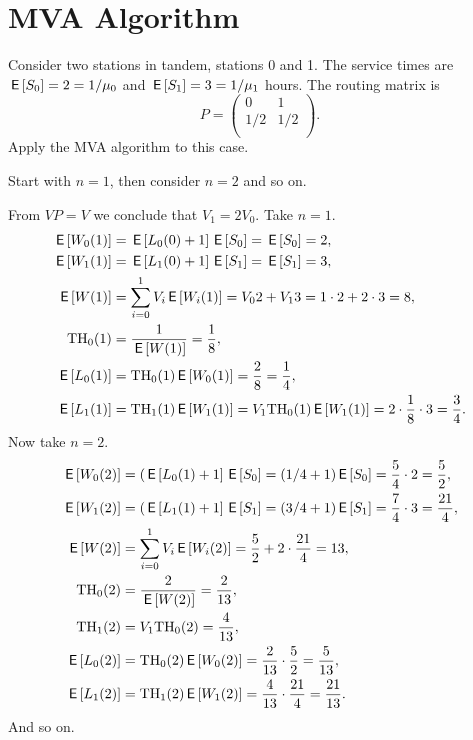
\section{MVA Algorithm}
\label{sec:mva}



\begin{exercise}\label{ex:mva_numerical}
  Consider two stations in tandem, stations 0 and 1. The service times
  are $\,\mathsf{E}\left[ S_0\right] = 2=1/\mu_0$ and $\,\mathsf{E}\left[ S_1\right] = 3=1/\mu_1$ hours. The routing matrix is
  \begin{equation*}
    P=
    \begin{pmatrix}
      0 & 1\\
1/2 & 1/2\\
    \end{pmatrix}.
  \end{equation*}
Apply the MVA algorithm to this case.
\begin{hint}
Start with $n=1$, then consider $n=2$ and so on.
\end{hint}
\begin{solution}
  From $V P = V$ we conclude that $V_1=2V_0$.  Take $n=1$.
  \begin{align*}
\,\mathsf{E}\left[ W_0(1)\right] &= \,\mathsf{E}\left[ L_0(0)+1\right]\,\mathsf{E}\left[ S_0\right] = \,\mathsf{E}\left[ S_0 \right]= 2,\\
 \,\mathsf{E}\left[ W_1(1)\right] &= \,\mathsf{E}\left[ L_1(0)+1\right]\,\mathsf{E}\left[ S_1\right] = \,\mathsf{E}\left[ S_1\right] = 3,\\
 \,\mathsf{E}\left[ W(1)\right] &= \sum_{i=0}^1 V_i \,\mathsf{E}\left[ W_i(1)\right] = V_0 2 + V_1  3 = 1\cdot 2 + 2 \cdot 3 = 8,\\
 \mathrm{TH}_0(1) &= \frac{1}{\,\mathsf{E}\left[ W(1)\right]} = \frac18, \\
 \,\mathsf{E}\left[ L_0(1)\right] &= \mathrm{TH}_0(1) \,\mathsf{E}\left[ W_0(1)\right] = \frac28=\frac14, \\
 \,\mathsf{E}\left[ L_1(1)\right] &= \mathrm{TH}_1(1) \,\mathsf{E}\left[ W_1(1)\right] = V_1 \mathrm{TH}_0(1) \,\mathsf{E}\left[ W_1(1)\right]= 2 \cdot \frac18 \cdot 3 = \frac34.\\
  \end{align*}
Now take $n=2$.     
  \begin{align*}
\,\mathsf{E}\left[ W_0(2) \right]&= (\,\mathsf{E}\left[ L_0(1)+1\right]\,\mathsf{E}\left[ S_0\right]= (1/4+1)\,\mathsf{E}\left[ S_0\right] = \frac54\cdot2=\frac52,\\
\,\mathsf{E}\left[ W_1(2) \right]&= (\,\mathsf{E}\left[ L_1(1)+1\right]\,\mathsf{E}\left[ S_1\right] = (3/4+1)\,\mathsf{E}\left[ S_1\right] = \frac74\cdot3=\frac{21}4,\\
\,\mathsf{E}\left[ W(2) \right]&= \sum_{i=0}^1 V_i \,\mathsf{E}\left[ W_i(2)\right] = \frac52 + 2 \cdot \frac{21}4=13,\\
\mathrm{TH}_0(2) &= \frac{2}{\,\mathsf{E}\left[ W(2)\right]} = \frac2{13}, \\
\mathrm{TH}_1(2) &= V_1 \mathrm{TH}_0(2) = \frac4{13}, \\
\,\mathsf{E}\left[ L_0(2)\right] &= \mathrm{TH}_0(2) \,\mathsf{E}\left[ W_0(2)\right] = \frac2{13}\cdot \frac52=\frac5{13}, \\
\,\mathsf{E}\left[ L_1(2)\right] &= \mathrm{TH}_1(2) \,\mathsf{E}\left[ W_1(2)\right] = \frac{4}{13} \cdot \frac{21}{4} = \frac{21}{13}.\\
  \end{align*}
And so on.
\end{solution}
\end{exercise}


